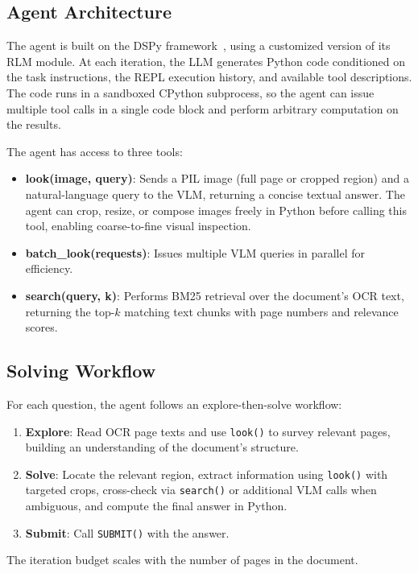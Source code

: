 \documentclass[10pt,twocolumn]{article}
\begin{document}
\subsection{Agent Architecture}

The agent is built on the DSPy framework~\cite{khattab2024dspy}, using a customized version of its RLM module. At each iteration, the LLM generates Python code conditioned on the task instructions, the REPL execution history, and available tool descriptions. The code runs in a sandboxed CPython subprocess, so the agent can issue multiple tool calls in a single code block and perform arbitrary computation on the results.

The agent has access to three tools:
\begin{itemize}
  \item \textbf{look(image, query)}: Sends a PIL image (full page or cropped region) and a natural-language query to the VLM, returning a concise textual answer. The agent can crop, resize, or compose images freely in Python before calling this tool, enabling coarse-to-fine visual inspection.
  \item \textbf{batch\_look(requests)}: Issues multiple VLM queries in parallel for efficiency.
  \item \textbf{search(query, k)}: Performs BM25 retrieval over the document's OCR text, returning the top-$k$ matching text chunks with page numbers and relevance scores.
\end{itemize}

\subsection{Solving Workflow}

For each question, the agent follows an explore-then-solve workflow:
\begin{enumerate}
  \item \textbf{Explore}: Read OCR page texts and use \texttt{look()} to survey relevant pages, building an understanding of the document's structure.
  \item \textbf{Solve}: Locate the relevant region, extract information using \texttt{look()} with targeted crops, cross-check via \texttt{search()} or additional VLM calls when ambiguous, and compute the final answer in Python.
  \item \textbf{Submit}: Call \texttt{SUBMIT()} with the answer.
\end{enumerate}
The iteration budget scales with the number of pages in the document.
\end{document}
